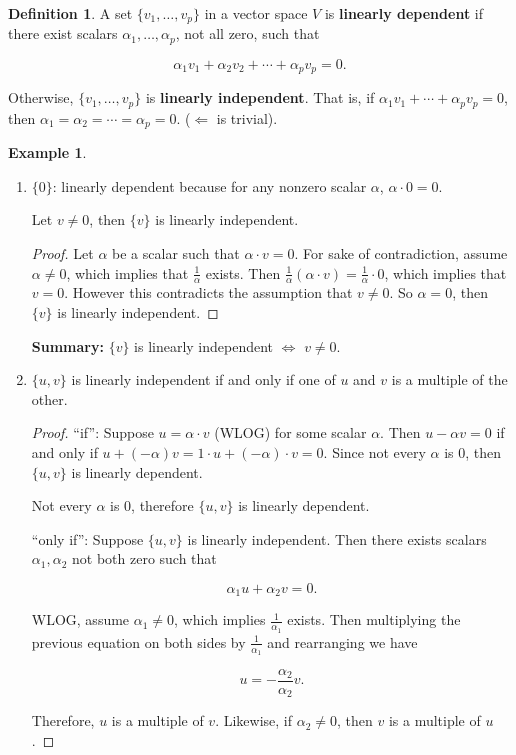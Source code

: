 \documentclass[12pt]{article}
\theoremstyle{definition}
\newtheorem*{definition}{Definition}
\newtheorem*{example}{Example}
\begin{document}
\begin{definition}
A set $\{v_1, \ldots, v_p\}$ in a vector space $V$ is \textbf{linearly dependent} if there
exist scalars $\alpha_1, \ldots, \alpha_p$, not all zero, such that

\[ \alpha_1 v_1 + \alpha_2 v_2 + \cdots + \alpha_p v_p = 0. \]

Otherwise, $\{v_1, \ldots, v_p\}$ is \textbf{linearly independent}. That is, if
$\alpha_1 v_1 + \cdots + \alpha_p v_p = 0$, then 
$\alpha_1 = \alpha_2 = \cdots = \alpha_p = 0$. ($\Leftarrow$ is trivial).
\end{definition}

\begin{example} $ $
\begin{enumerate}[label = (\arabic*)]
\item $\{ 0 \}$: linearly dependent because for any nonzero scalar $\alpha$, $\alpha \cdot 0 = 0$.

Let $v \neq 0$, then $\{ v \}$ is linearly independent.

\begin{proof}
Let $\alpha$ be a scalar such that $\alpha \cdot v = 0$. For sake of contradiction, assume
$\alpha \neq 0$, which implies that $\frac{1}{\alpha}$ exists. Then
$\displaystyle \frac{1}{\alpha} (\alpha \cdot v) = \frac{1}{\alpha} \cdot 0$, which implies
that $v = 0$. However this contradicts the assumption that $v \neq 0$. So $\alpha = 0$,
then $\{ v \}$ is linearly independent.
\end{proof}

\textbf{Summary:} $\{ v \}$ is linearly independent $\iff$ $v \neq 0$.


\item $\{ u, v \}$ is linearly independent if and only if one of $u$ and $v$ is a 
multiple of the other.

\begin{proof}
``if'': Suppose $u = \alpha \cdot v$ (WLOG) for some scalar $\alpha$. Then $u - \alpha v = 0$
if and only if $u + (-\alpha) v = 1 \cdot u + (-\alpha) \cdot v = 0$. Since not every $\alpha$
is 0, then $\{ u, v \}$ is linearly dependent. 

Not every $\alpha$ is 0, therefore $\{ u, v \}$ is linearly dependent.

``only if'': Suppose $\{ u, v \}$ is linearly independent. Then there exists scalars
$\alpha_1, \alpha_2$ not both zero such that 

\[ \alpha_1 u + \alpha_2 v = 0. \] 

WLOG, assume $\alpha_1 \neq 0$, which implies $\displaystyle \frac{1}{\alpha_1}$ exists. Then
multiplying the previous equation on both sides by $\displaystyle \frac{1}{\alpha_1}$ and 
rearranging we have

\[ u = -\frac{\alpha_2}{\alpha_2} v. \]

Therefore, $u$ is a multiple of $v$. Likewise, if $\alpha_2 \neq 0$, then $v$ is a
multiple of $u$.
\end{proof}

\end{enumerate}
\end{example}
\end{document}
